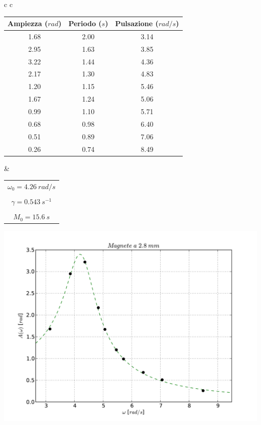 \begin{center}

\begin{tabular}{c c}

\begin{tabular}{c | c | c}
\textbf{Ampiezza} ($rad$) & \textbf{Periodo} ($s$) & \textbf{Pulsazione} ($rad/s$)\\
\midrule
1.68 & 2.00 & 3.14\\
2.95 & 1.63 & 3.85\\
3.22 & 1.44 & 4.36\\
2.17 & 1.30 & 4.83\\
1.20 & 1.15 & 5.46\\
1.67 & 1.24 & 5.06\\
0.99 & 1.10 & 5.71\\
0.68 & 0.98 & 6.40\\
0.51 & 0.89 & 7.06\\
0.26 & 0.74 & 8.49\\
\end{tabular}

& \hspace{1cm}

\begin{tabular}{c}
$ \omega_0 = 4.26\ rad/s $\\
\\
$ \gamma = 0.543\ s^{-1} $\\
\\
$ M_0 = 15.6\ s$\\
\end{tabular}

\end{tabular}

\end{center}

\begin{center}
\includegraphics[scale=0.75]{"../grafici/Magnetea28mm"}

\end{center}


